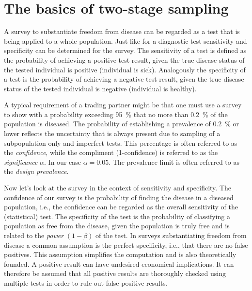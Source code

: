 \documentclass[nojss]{jss}
\begin{document}
%
%

\section{The basics of two-stage sampling} 
\label{sec:2-stage-sampling} 

A survey to substantiate freedom from disease can be regarded as a 
test that is being applied to a whole population. Just like for a 
diagnostic test sensitivity and specificity can be determined for 
the survey. The sensitivity of a test is defined as the probability 
of achieving a positive test result, given the true disease status 
of the tested individual is positive (individual is sick). 
Analogously the specificity of a test is the probability of 
achieving a negative test result, given the true disease status of 
the tested individual is negative (individual is healthy). 

A typical requirement of a trading partner might be that one must 
use a survey to show with a probability exceeding 95~\% that no more 
than 0.2~\% of the population is diseased. The probability of 
establishing a prevalence of 0.2~\% or lower reflects the 
uncertainty that is always present due to sampling of a 
subpopulation only and imperfect tests. This percentage is often 
referred to as the \emph{confidence}, while the compliment 
(1-confidence) is referred to as the \emph{significance} $\alpha$. 
In our case $\alpha = 0.05$. The prevalence limit is often referred 
to as the \emph{design prevalence}.

Now let's look at the survey in the context of sensitivity and 
specificity. The confidence of our survey is the probability of 
finding the disease in a diseased population, i.e., the confidence 
can be regarded as the overall sensitivity of the (statistical) 
test. The specificity of the test is the probability of  classifying 
a population as free from the disease, given the population is truly 
free and is related to the \emph{power} $(1-\beta)$ of the test. In 
surveys substantiating freedom from disease a common assumption is 
the perfect specificity, i.e., that there are no false positives. 
This assumption simplifies the computation and is also theoretically 
founded. A positive result can have undesired economical 
implications. It can therefore be assumed that all positive results 
are thoroughly checked using multiple tests in order to rule out 
false positive results.  
\end{document}
